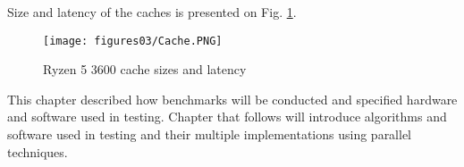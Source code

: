 Size and latency of the caches is presented on Fig. \ref{fig:Cache}.

\begin{figure}[!ht]
	\centering
		\texttt{[image: figures03/Cache.PNG]}
	\caption{Ryzen 5 3600 cache sizes and latency}
	\label{fig:Cache}
\end{figure}

This chapter described how benchmarks will be conducted and specified hardware and software used in testing. Chapter that follows will introduce algorithms and software used in testing and their multiple implementations using parallel techniques. 
